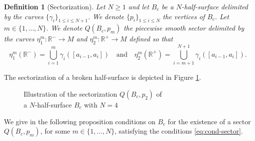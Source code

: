 \documentclass{article}
\newcommand{\R}{\mathbb{R}}
\newcommand{\surf}{M}
\newcommand{\sect}{Q}
\newcommand{\halfP}{B}
\newtheorem{definitionE}[theorem]{Definition}
\theoremstyle{remark}
\theoremstyle{prpart}
\begin{document}
\begin{definitionE}[Sectorization]
Let $N\geq1$ and let $\halfP_c$ be a $N$-half-surface delimited by the curves $\{\gamma_i\}_{1\leq i\leq N+1}$. We denote $\{p_i\}_{1\leq i\leq N}$ the vertices of $\halfP_c$. Let $m\in\{1,...,N\}$. We denote $\sect(\halfP_c,p_m)$ the piecewise smooth sector delimited by the curves $\eta_1^m:\R^-\to\surf$ and $\eta_2^m:\R^+\to\surf$ defined so that
\begin{equation}\label{eq:curves-half-surfaces}
\eta^m_1(\R^-) = \bigcup_{i=1}^{m}\gamma_i([a_{i-1},a_{i}]) \quad\text{and}\quad \eta_2^m(\R^+) = \bigcup_{i=m+1}^{N+1}\gamma_i([a_{i-1},a_{i}]).
\end{equation}
\end{definitionE}
The sectorization of a broken half-surface is depicted in Figure \ref{fig:sectorization}.
\begin{figure}[!htp]
  \centering
  \caption{Illustration of the sectorization $\sect(\halfP_c,p_2)$ of\\ a $N$-half-surface $\halfP_c$ with $N=4$}\label{fig:sectorization}
\end{figure}
We give in the following proposition conditions on $\halfP_c$ for the existence of a sector $\sect(\halfP_c,p_m)$, for some $m\in\{1,...,N\}$, satisfying the conditions \eqref{eq:cond-sector}.
\end{document}

